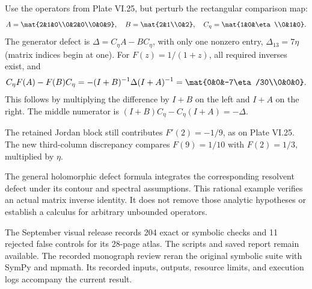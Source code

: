 Use the operators from Plate VI.25, but perturb the rectangular comparison map:
\[
A=\mat{2&1&0\\0&2&0\\0&0&9},\quad
B=\mat{2&1\\0&2},\quad
C_\eta=\mat{1&0&\eta\\0&1&0}.
\]
The generator defect is $\Delta=C_\eta A-BC_\eta$, with only one nonzero entry, $\Delta_{13}=7\eta$ (matrix indices begin at one).
For $F(z)=1/(1+z)$, all required inverses exist, and
\[
C_\eta F(A)-F(B)C_\eta
=-(I+B)^{-1}\Delta(I+A)^{-1}
=\mat{0&0&-7\eta/30\\0&0&0}.
\]
This follows by multiplying the difference by $I+B$ on the left and $I+A$ on the right. The middle numerator is $(I+B)C_\eta-C_\eta(I+A)=-\Delta$.

The retained Jordan block still contributes $F'(2)=-1/9$, as on Plate VI.25. The new third-column discrepancy compares $F(9)=1/10$ with $F(2)=1/3$, multiplied by $\eta$.

The general holomorphic defect formula integrates the corresponding resolvent defect under its contour and spectral assumptions. This rational example verifies an actual matrix inverse identity. It does not remove those analytic hypotheses or establish a calculus for arbitrary unbounded operators.

The September visual release records 204 exact or symbolic checks and 11 rejected false controls for its 28-page atlas. The scripts and saved report remain available. The recorded monograph review reran the original symbolic suite with SymPy and mpmath. Its recorded inputs, outputs, resource limits, and execution logs accompany the current result.

